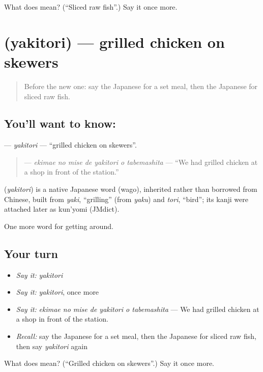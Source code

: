 \begin{tcolorbox}[breakable,colback=teal!4,colframe=teal!35!black,title={Before you move on}]
What does  mean? (\textquotedblleft{}Sliced raw fish\textquotedblright{}.) Say it once more.
\end{tcolorbox}
\section[\texorpdfstring{\ja{やきとり} (yakitori)}{やきとり (yakitori)}]{ (yakitori) — grilled chicken on skewers}

\label{lesson:JA-C422-yakitori}



\begin{quote}
Before the new one: say the Japanese for a set meal, then the Japanese for sliced raw fish.
\end{quote}

\subsection*{You'll want to know: }
\textbf{} — \emph{yakitori} — \textquotedblleft{}grilled chicken on skewers\textquotedblright{}.

\begin{quote}
\textbf{   } — \emph{ekimae no mise de yakitori o tabemashita} — \textquotedblleft{}We had grilled chicken at a shop in front of the station.\textquotedblright{}
\end{quote}

\begin{cousinweb}
\textbf{} (\emph{yakitori}) is a native Japanese word (wago), inherited rather than borrowed from Chinese, built from \emph{yaki}, \textquotedblleft{}grilling\textquotedblright{} (from \emph{yaku}) and \emph{tori}, \textquotedblleft{}bird\textquotedblright{}; its kanji were attached later as kun'yomi (JMdict).
\end{cousinweb}

\begin{grammarlens}[title={What you've built}]
One more word for getting around.
\end{grammarlens}

\subsection*{Your turn}
\begin{itemize}
\raggedright
  \item \emph{Say it:} \emph{yakitori}
  \item \emph{Say it:} \emph{yakitori}, once more
  \item \emph{Say it:} \emph{ekimae no mise de yakitori o tabemashita} — We had grilled chicken at a shop in front of the station.
  \item \emph{Recall:} say the Japanese for a set meal, then the Japanese for sliced raw fish, then say \emph{yakitori} again
\end{itemize}

\begin{tcolorbox}[breakable,colback=teal!4,colframe=teal!35!black,title={Before you move on}]
What does  mean? (\textquotedblleft{}Grilled chicken on skewers\textquotedblright{}.) Say it once more.
\end{tcolorbox}
